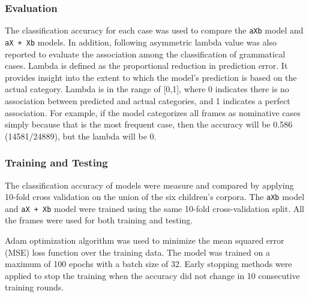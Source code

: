 \subsubsection{Evaluation}
The classification accuracy for each case was used to compare the \texttt{aXb} model and \texttt{aX + Xb} models. In addition, following \citet{clair2010learning} asymmetric lambda value \citet{goodman1979measures} was also reported to evaluate the association among the classification of grammatical cases. Lambda is defined as the proportional reduction in prediction error. It provides insight into the extent to which the model's prediction is based on the actual category. Lambda is in the range of [0,1], where 0 indicates there is no association between predicted and actual categories, and 1 indicates a perfect association. For example, if the model categorizes all frames as nominative cases simply because that is the most frequent case, then the accuracy will be 0.586 (14581/24889), but the lambda will be 0. 
\subsubsection{Training and Testing}
The classification accuracy of models were measure and compared by applying 10-fold cross validation on the union of the six children's corpora. The \texttt{aXb} model and \texttt{aX + Xb} model were trained using the same 10-fold cross-validation split. All the frames were used for both training and testing. 

Adam optimization algorithm was used to minimize the mean squared error (MSE) loss function over the training data. The model was trained on a maximum of 100 epochs with a batch size of 32. Early stopping methods were applied to stop the training when the accuracy did not change in 10 consecutive training rounds. 


